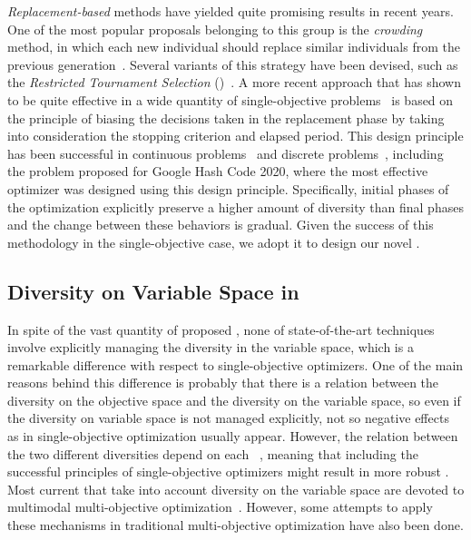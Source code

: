 \textit{Replacement-based} methods have yielded quite promising results in recent years.
%
One of the most popular proposals belonging to this group is the \textit{crowding} method, 
in which each new individual should replace similar individuals from the previous generation~\cite{mengshoel2014adaptive}.
%
Several variants of this strategy have been devised, such as the \textit{Restricted Tournament Selection} 
(\RTS{})~\cite{harik1995finding}.
%
A more recent approach that has shown to be quite effective in a wide quantity of single-objective problems~\cite{segura2016improving}
is based on the principle of biasing the decisions taken in the replacement phase by taking into consideration the 
stopping criterion and elapsed period.
%
This design principle has been successful in continuous problems~\cite{castillo2019differential} and discrete 
problems~\cite{segura2016improving,romero2018memetic}, including the problem proposed for Google Hash Code 2020, where the most
effective optimizer was designed using this design principle.
%
Specifically, initial phases of the optimization explicitly preserve a higher amount of diversity than final phases and the
change between these behaviors is gradual.
%
Given the success of this methodology in the single-objective case, we adopt it to design our novel \MOEA{}.


\subsection{Diversity on Variable Space in \MOEAS{}}\label{MOEAs:Diversity}

In spite of the vast quantity of proposed \MOEAS{}, none of state-of-the-art techniques involve
explicitly managing the diversity in the variable space, which is a remarkable difference with respect
to single-objective optimizers.
%
One of the main reasons behind this difference is probably that there is a relation between the diversity on the objective 
space and the diversity on the variable space, so even if the diversity on variable space is not managed explicitly,
not so negative effects as in single-objective optimization usually appear.
%
%
However, the relation between the two different diversities depend on each \MOP{}~\cite{shir2009enhancing}, meaning
that including the successful principles of single-objective optimizers might result in more robust \MOEAS{}.
%
Most current \MOEAS{} that take into account diversity on the variable space are devoted to multimodal 
multi-objective optimization~\cite{deb2008omni, cuate2019variation}.
%
However, some attempts to apply these mechanisms in traditional multi-objective optimization have also been done.

